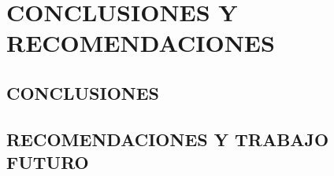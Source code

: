 \chapter{CONCLUSIONES Y RECOMENDACIONES}

\section{CONCLUSIONES}

\section{RECOMENDACIONES Y TRABAJO FUTURO}
